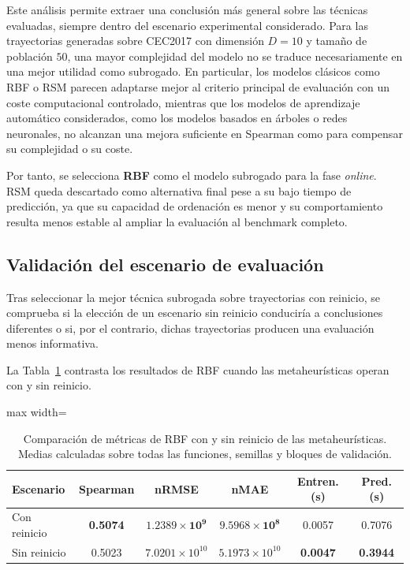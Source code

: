 Este análisis permite extraer una conclusión más general sobre las técnicas
evaluadas, siempre dentro del escenario experimental considerado. Para las
trayectorias generadas sobre CEC2017 con dimensión \(D=10\) y tamaño de
población \(50\), una mayor complejidad del modelo no se traduce
necesariamente en una mejor utilidad como subrogado. En particular, los modelos
clásicos como RBF o RSM parecen adaptarse mejor al criterio principal de
evaluación con un coste computacional controlado, mientras que los modelos de
aprendizaje automático considerados, como los modelos basados en árboles o
redes neuronales, no alcanzan una mejora suficiente en Spearman como para
compensar su complejidad o su coste.

Por tanto, se selecciona \textbf{RBF} como el modelo subrogado para la
fase \textit{online}. RSM queda descartado como alternativa final pese a su bajo
tiempo de predicción, ya que su capacidad de ordenación es menor y su
comportamiento resulta menos estable al ampliar la evaluación al benchmark
completo.

\subsection{Validación del escenario de evaluación}

Tras seleccionar la mejor técnica subrogada sobre trayectorias con reinicio, se comprueba si la elección de un escenario sin reinicio conduciría a conclusiones diferentes o si, por el contrario, dichas trayectorias producen una evaluación menos informativa.

La Tabla~\ref{tab:comparativa_reinicio_surrogate} contrasta los resultados de RBF cuando las metaheurísticas operan con y sin reinicio.

\begin{table}[H]
    \centering
    \small
    \begin{adjustbox}{max width=\textwidth}
        \begin{tabular}{lccccc}
            \toprule
            \textbf{Escenario} & \textbf{Spearman} & \textbf{nRMSE}                  & \textbf{nMAE}                   & \textbf{Entren. (s)} & \textbf{Pred. (s)} \\
            \midrule
            Con reinicio       & \textbf{0.5074}   & \(\mathbf{1.2389 \times 10^9}\) & \(\mathbf{9.5968 \times 10^8}\) & 0.0057               & 0.7076             \\
            Sin reinicio       & 0.5023            & \(7.0201 \times 10^{10}\)       & \(5.1973 \times 10^{10}\)       & \textbf{0.0047}      & \textbf{0.3944}    \\
            \bottomrule
        \end{tabular}
    \end{adjustbox}
    \caption[Comparación de métricas de RBF con y sin reinicio de las metaheurísticas]{Comparación de métricas de RBF con y sin reinicio de las metaheurísticas. Medias calculadas sobre todas las funciones, semillas y bloques de validación.}
    \label{tab:comparativa_reinicio_surrogate}
\end{table}

